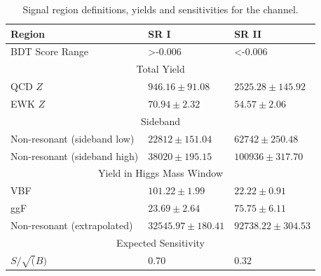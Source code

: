 \begin{table}[]
\centering
\caption{Signal region definitions, yields and sensitivities for the \twocentral channel. }
\label{tab:BDTReg2cen_alt}
\begin{tabular}{|l|l|l|}
\hline
Region                       & SR I                  & SR II                 \\ \hline
BDT Score Range              & \textgreater -0.006    & \textless -0.006       \\ \hline
\multicolumn{3}{|c|}{Total Yield}                                            \\ \hline
QCD $Z$                      & $946.16 \pm 91.08$    & $2525.28 \pm 145.92$  \\ \hline
EWK $Z$                      & $70.94 \pm 2.32$      & $54.57 \pm 2.06$      \\ \hline
\multicolumn{3}{|c|}{Sideband}                                               \\ \hline
Non-resonant (sideband low)  & $22812 \pm 151.04$    & $62742 \pm 250.48 $   \\ \hline
Non-resonant (sideband high) & $38020 \pm 195.15$    & $100936 \pm 317.70 $  \\ \hline
\multicolumn{3}{|c|}{Yield in Higgs Mass Window}                             \\ \hline
VBF                          & $101.22 \pm 1.99$     & $22.22\pm 0.91$       \\ \hline
ggF                          & $23.69 \pm 2.64$      & $75.75\pm 6.11$       \\ \hline
Non-resonant (extrapolated)   & $32545.97 \pm 180.41$ & $92738.22 \pm 304.53$ \\ \hline
\multicolumn{3}{|c|}{Expected Sensitivity}                                   \\ \hline
$S/ \sqrt(B)$                & 0.70                  & 0.32                  \\ \hline
\end{tabular}
\end{table}


